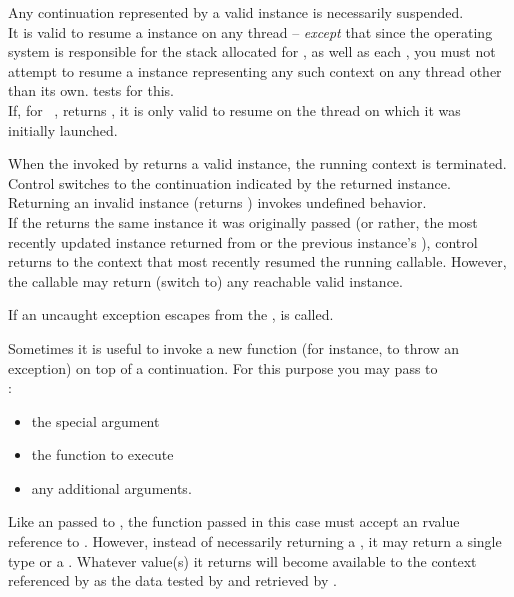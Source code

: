 Any continuation represented by a valid \cont instance is necessarily suspended.\\
It is valid to resume a \cont instance on any thread -- \emph{except} that
since the operating system is responsible for the stack allocated for \main,
as well as each , you must not attempt to resume a \cont
instance representing any such context on any thread other
than its own.  tests for this.\\
If, for \cont\ ,  returns , it is
only valid to resume  on the thread on which it was initially
launched.


When the \entryfn invoked by \cc returns a valid \cont instance,
the running context is terminated. Control switches to the continuation
indicated by the returned \cont instance.\\
Returning an invalid \cont instance (\opbool returns ) invokes
undefined behavior.\\
If the \entryfn returns the same \cont instance it was originally
passed (or rather, the most recently updated instance returned from \call or the
previous instance's \op), control returns to the context that most
recently resumed the running callable. However, the callable may return (switch
to) any reachable valid \cont instance.


\label{subsec:exceptions}
If an uncaught exception escapes from the \entryfn,  is
called.


Sometimes it is useful to invoke a new function (for instance, to throw an
exception) on top of a continuation. For this purpose you may pass to\\
:

\begin{itemize}
  \item the special argument 
  \item the function to execute
  \item any additional arguments.
\end{itemize}

Like an \entryfn passed to \callcc, the function passed in this case must
accept an rvalue reference to \cont. However, instead of necessarily returning
a \cont, it may return a single type or a . Whatever value(s)
it returns will become available to the context referenced by  as
the data tested by \davail and retrieved by \dget.\\

